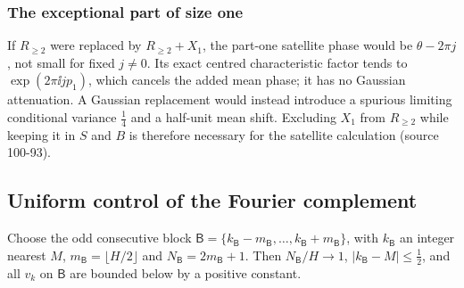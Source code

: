\documentclass[11pt]{article}
\numberwithin{equation}{section}
\theoremstyle{definition}\newtheorem{definition}[theorem]{Definition}
\theoremstyle{remark}\newtheorem{remark}[theorem]{Remark}
\newcommand{\src}[1]{\textup{(source #1)}}
\begin{document}
\subsubsection{The exceptional part of size one}\label{dpn:ct:sec:partone}
If $R_{\ge2}$ were replaced by $R_{\ge2}+X_1$, the part-one satellite phase
would be $\theta-2\pi j$, not small for fixed $j\ne0$.  Its exact centred
characteristic factor tends to $\exp(2\pi\ii jp_1)$, which cancels the added
mean phase; it has no Gaussian attenuation.  A Gaussian replacement would
instead introduce a spurious limiting conditional variance $\frac14$ and a
half-unit mean shift.  Excluding $X_1$ from $R_{\ge2}$ while keeping it in $S$
and $B$ is therefore necessary for the satellite calculation \src{100-93}.

\subsection{Uniform control of the Fourier complement}\label{dpn:ct:sec:complement}
Choose the odd consecutive block $\mathsf B=\{k_{\mathsf B}-m_{\mathsf B},\dots,
k_{\mathsf B}+m_{\mathsf B}\}$, with $k_{\mathsf B}$ an integer nearest $M$,
$m_{\mathsf B}=\lfloor H/2\rfloor$ and $N_{\mathsf B}=2m_{\mathsf B}+1$.  Then
$N_{\mathsf B}/H\to1$, $|k_{\mathsf B}-M|\le\frac12$, and all $v_k$ on
$\mathsf B$ are bounded below by a positive constant.
\end{document}
